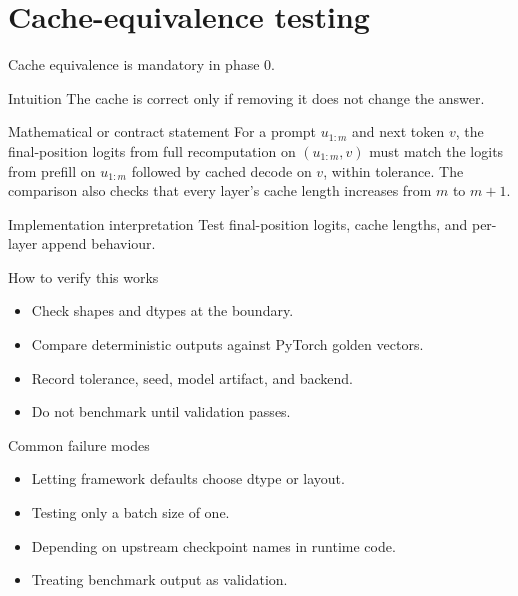 \chapter{Cache-equivalence testing}
\label{ch:cache-equivalence}
Cache equivalence is mandatory in phase 0.



\begin{intuitionbox}{Intuition}
The cache is correct only if removing it does not change the answer.
\end{intuitionbox}

\begin{definitionbox}{Mathematical or contract statement}
For a prompt \(u_{1:m}\) and next token \(v\), the final-position logits from full recomputation on \((u_{1:m},v)\) must match the logits from prefill on \(u_{1:m}\) followed by cached decode on \(v\), within tolerance. The comparison also checks that every layer's cache length increases from \(m\) to \(m+1\).
\end{definitionbox}

\begin{implementationbox}{Implementation interpretation}
Test final-position logits, cache lengths, and per-layer append behaviour.
\end{implementationbox}

\begin{verificationbox}{How to verify this works}
\begin{itemize}
\item Check shapes and dtypes at the boundary.
\item Compare deterministic outputs against PyTorch golden vectors.
\item Record tolerance, seed, model artifact, and backend.
\item Do not benchmark until validation passes.
\end{itemize}
\end{verificationbox}

\begin{warningbox}{Common failure modes}
\begin{itemize}
\item Letting framework defaults choose dtype or layout.
\item Testing only a batch size of one.
\item Depending on upstream checkpoint names in runtime code.
\item Treating benchmark output as validation.
\end{itemize}
\end{warningbox}

